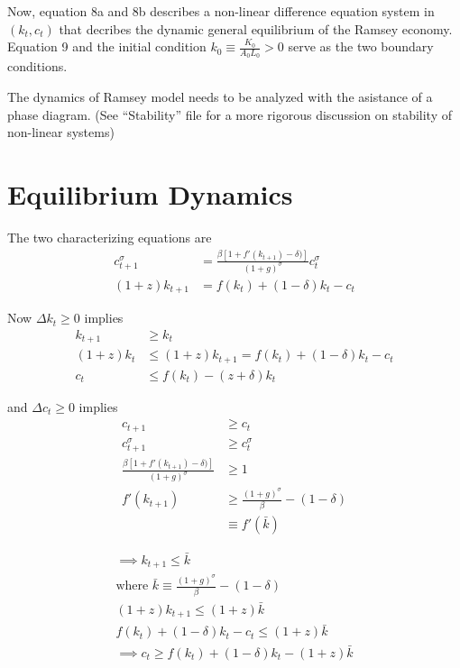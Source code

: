 \documentclass[twocolumn, fleqn]{article}
\begin{document}
		Now, equation 8a and 8b describes a non-linear difference equation system in $(k_t, c_t)$ that decribes the
		dynamic general equilibrium of the Ramsey economy.
		Equation 9 and the initial condition $k_0 \equiv \frac{K_0}{A_0L_0}>0$ serve as the two boundary conditions.

		The dynamics of Ramsey model needs to be analyzed with the asistance of a phase diagram.
		(See ``Stability'' file for a more rigorous discussion on stability of non-linear systems)

		\section{Equilibrium Dynamics}\label{sec:equilibrium-dynamics}
		The two characterizing equations are
		\begin{align}
			c_{t+1}^{\sigma} &= \frac{\beta [1+f'(k_{t+1})-\delta)]}{(1+g)^\sigma}c_{t}^{\sigma} \label{c-locus}\\
			(1+z)k_{t+1} &= f(k_t) + (1-\delta) k_t - c_t \label{k-locus}
		\end{align}

		Now $\Delta k_t \geq 0$ implies
		\begin{align*}
			k_{t+1} &\geq k_{t} \\
			(1+z)k_t &\leq (1+z)k_{t+1} = f(k_t) + (1-\delta) k_t - c_t\\
			c_t &\leq f(k_t) - (z+\delta)k_t
		\end{align*}

		and $\Delta c_t \geq 0$ implies
		\begin{align*}
			c_{t+1} &\geq c_t \\
			c_{t+1}^{\sigma} &\geq c_t^{\sigma}\\
			\frac{\beta [1+f'(k_{t+1})-\delta)]}{(1+g)^\sigma} &\geq 1\\
			f'(k_{t+1}) &\geq \frac{(1+g)^\sigma}{\beta} - (1-\delta) \\
			&\equiv f'(\bar k)
		\end{align*}

		\begin{gather*}
			\implies k_{t+1} \leq \bar{k}\\
			\text{where } \bar k \equiv \frac{(1+g)^\sigma}{\beta} - (1-\delta)\\
			(1+z)k_{t+1} \leq (1+z)\bar{k}\\
			f(k_t)+(1-\delta)k_t - c_t \leq (1+z)\bar{k}\\[4pt]
			\implies c_t \geq f(k_t)+(1-\delta)k_t - (1+z)\bar{k}
		\end{gather*}
\end{document}
